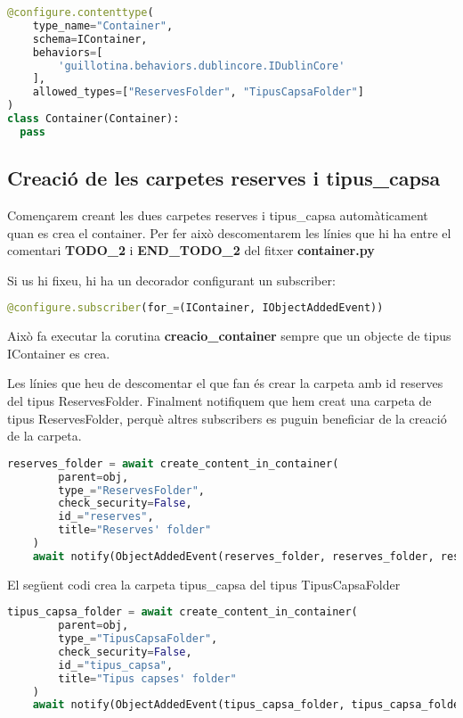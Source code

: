 \documentclass[a4paper, 11pt]{article}
\begin{document}
\begin{lstlisting}[language=Python, caption=Definició container]
@configure.contenttype(
    type_name="Container",
    schema=IContainer,
    behaviors=[
        'guillotina.behaviors.dublincore.IDublinCore'
    ],
    allowed_types=["ReservesFolder", "TipusCapsaFolder"]
)
class Container(Container):
  pass
\end{lstlisting}


\subsection{Creació de les carpetes reserves i tipus\_capsa}
Començarem creant les dues carpetes reserves i tipus\_capsa
automàticament quan es crea el container. Per fer això descomentarem
les línies que hi ha entre el comentari \textbf{TODO\_2} i
\textbf{END\_TODO\_2} del fitxer \textbf{container.py}

Si us hi fixeu, hi ha un decorador configurant un subscriber:
\begin{lstlisting}[language=Python, caption=Subscriber container]
  @configure.subscriber(for_=(IContainer, IObjectAddedEvent))
\end{lstlisting}
Això fa executar la corutina \textbf{creacio\_container} sempre que un objecte
de tipus IContainer es crea.
  
Les línies que heu de descomentar el que fan és crear la carpeta amb
id reserves del tipus ReservesFolder. Finalment notifiquem que hem
creat una carpeta de tipus ReservesFolder, perquè altres subscribers
es puguin beneficiar de la creació de la carpeta.
\begin{lstlisting}[language=Python, caption=Creació reserves folder]
  reserves_folder = await create_content_in_container(
        parent=obj,
        type_="ReservesFolder",
        check_security=False,
        id_="reserves",
        title="Reserves' folder"
    )
    await notify(ObjectAddedEvent(reserves_folder, reserves_folder, reserves_folder.id))
\end{lstlisting}

El següent codi crea la carpeta tipus\_capsa del tipus TipusCapsaFolder
\begin{lstlisting}[language=Python, caption=Creació tipus\_capsa]
  tipus_capsa_folder = await create_content_in_container(
        parent=obj,
        type_="TipusCapsaFolder",
        check_security=False,
        id_="tipus_capsa",
        title="Tipus capses' folder"
    )
    await notify(ObjectAddedEvent(tipus_capsa_folder, tipus_capsa_folder, tipus_capsa_folder.id))
  \end{lstlisting}
\end{document}
